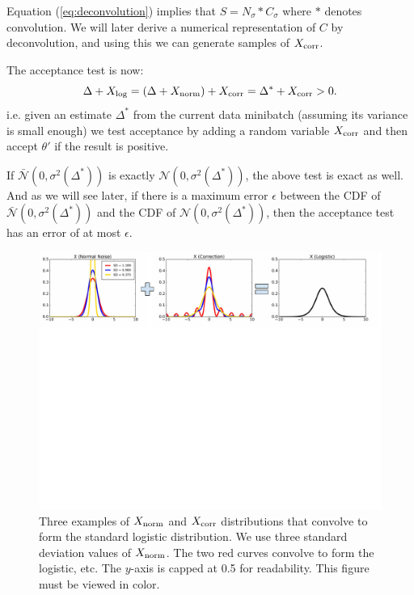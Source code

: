 \documentclass{article}
\begin{document}
Equation (\ref{eq:deconvolution}) implies that $S = N_{\sigma} * C_{\sigma}$ where $*$ denotes convolution. We will later
derive a numerical representation of $C$ by deconvolution, and using this we can generate
samples of $X_{\rm corr}$. 

  The acceptance test is now:
\begin{equation}\label{eq:criteria}
\Delta + X_{\rm log} = (\Delta + X_{\rm norm}) + X_{\rm corr} = \Delta^* + X_{\rm corr} >0.
\end{equation}
i.e. given an estimate $\Delta^*$ from the current data minibatch (assuming its
variance is small enough) we test acceptance by adding a random variable $X_{\rm corr}$ and
then accept $\theta'$ if the result is positive.

If $\mathcal{\bar{N}}(0, \sigma^2(\Delta^*))$ is exactly $\mathcal{N}(0, \sigma^2(\Delta^*))$,
the above test is exact as well. And as we will see later,  if there is a maximum error $\epsilon$ between
the CDF of $\mathcal{\bar{N}}(0, \sigma^2(\Delta^*))$ and the CDF of $\mathcal{N}(0, \sigma^2(\Delta^*))$,
then the acceptance test has an error of at most $\epsilon$. 

\begin{figure}[t]
    \centering
    \includegraphics[width=1\textwidth]{mh_convolution_diagram_v2}
    \caption{
    Three examples of $X_{\rm norm}$ and $X_{\rm corr}$ distributions that convolve to form the
    standard logistic distribution. We use three standard deviation values of $X_{\rm norm}$. The
    two red curves convolve to form the logistic, etc. The $y$-axis is capped at 0.5 for
    readability. This figure must be viewed in color.
    }
    \label{fig:deconvolution}
\end{figure}
\end{document}
